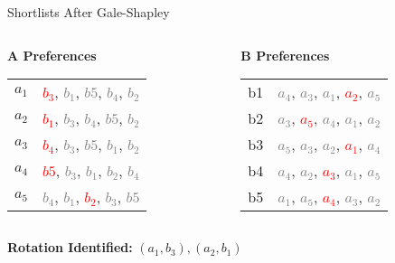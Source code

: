 \documentclass[aspectratio=169,xcolor=dvipsnames]{beamer}
\begin{document}
\begin{frame}{Shortlists After Gale-Shapley}

  \begin{columns}[t]
    \begin{column}{0.48\textwidth}
      \textbf{A Preferences}\\[6pt]
      \begin{tabular}{r@{: }l}
        $a_1$ & \textcolor{red}{$b_3$}, \textcolor{gray}{$b_1$}, \textcolor{gray}{$b5$}, \sout{\textcolor{gray}{$b_4$}}, \sout{\textcolor{gray}{$b_2$}} \\
        $a_2$ & \textcolor{red}{$b_1$}, \textcolor{gray}{$b_3$}, \textcolor{gray}{$b_4$}, \sout{\textcolor{gray}{$b5$}}, \sout{\textcolor{gray}{$b_2$}} \\
        $a_3$ & \textcolor{red}{$b_4$}, \textcolor{gray}{$b_3$}, \sout{\textcolor{gray}{$b5$}}, \textcolor{gray}{$b_1$}, \textcolor{gray}{$b_2$} \\
        $a_4$ & \textcolor{red}{$b5$}, \sout{\textcolor{gray}{$b_3$}}, \textcolor{gray}{$b_1$}, \sout{\textcolor{gray}{$b_2$}}, \textcolor{gray}{$b_4$} \\
        $a_5$ & \sout{\textcolor{gray}{$b_4$}}, \sout{\textcolor{gray}{$b_1$}}, \textcolor{red}{$b_2$}, \textcolor{gray}{$b_3$}, \textcolor{gray}{$b5$} \\
      \end{tabular}
    \end{column}

    \begin{column}{0.48\textwidth}
      \textbf{B Preferences}\\[6pt]
      \begin{tabular}{r@{: }l}
        b1 & \textcolor{gray}{$a_4$}, \textcolor{gray}{$a_3$}, \textcolor{gray}{$a_1$}, \textcolor{red}{$a_2$}, \sout{\textcolor{gray}{$a_5$}} \\
        b2 & \textcolor{gray}{$a_3$}, \textcolor{red}{$a_5$}, \sout{\textcolor{gray}{$a_4$}}, \sout{\textcolor{gray}{$a_1$}}, \sout{\textcolor{gray}{$a_2$}} \\
        b3 & \textcolor{gray}{$a_5$}, \textcolor{gray}{$a_3$}, \textcolor{gray}{$a_2$}, \textcolor{red}{$a_1$}, \sout{\textcolor{gray}{$a_4$}} \\
        b4 & \textcolor{gray}{$a_4$}, \textcolor{gray}{$a_2$}, \textcolor{red}{$a_3$}, \sout{\textcolor{gray}{$a_1$}}, \sout{\textcolor{gray}{$a_5$}} \\
        b5 & \textcolor{gray}{$a_1$}, \textcolor{gray}{$a_5$}, \textcolor{red}{$a_4$}, \sout{\textcolor{gray}{$a_3$}}, \sout{\textcolor{gray}{$a_2$}} \\
      \end{tabular}
    \end{column}
  \end{columns}

  \vspace{1em}
  \pause
  \textbf{Rotation Identified:} $(a_1, b_3), (a_2, b_1)$
\end{frame}
\end{document}
